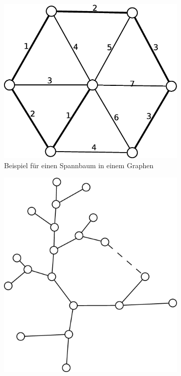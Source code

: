 \begin{figure}[H]
\centering
\begin{subfigure}[H]{0.3\textwidth}
	\includegraphics[width=\linewidth]{19/Grafik/Spannbaum}
	\caption{Beispiel für einen Spannbaum in einem Graphen}
	\label{fig:Spannbaum}
\end{subfigure}
\begin{subfigure}[H]{0.3\textwidth}
	\includegraphics[width=\linewidth]{19/Grafik/SpannbaumBeispiel2}

\end{subfigure}
\end{figure}
